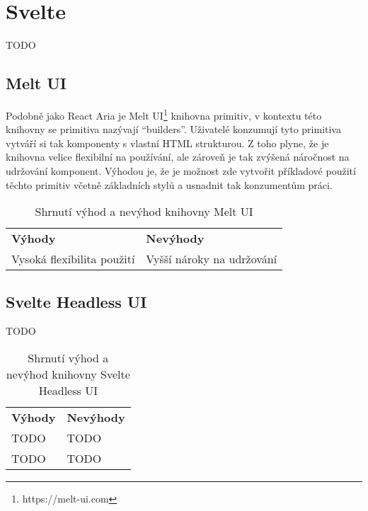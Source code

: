 \clearpage

\section{Svelte}

TODO

\subsection{Melt UI}

Podobně jako React Aria je Melt UI\footnote{https://melt-ui.com} knihovna primitiv, v kontextu této knihovny se primitiva nazývají ``builders''.
Uživatelé konzumují tyto primitiva vytváří si tak komponenty s vlastní HTML strukturou.
Z toho plyne, že je knihovna velice flexibilní na používání, ale zároveň je tak zvýšená náročnost na udržování komponent.
Výhodou je, že je možnost zde vytvořit příkladové použití těchto primitiv včetně základních stylů a usnadnit tak konzumentům práci.

\begin{table}[ht]
    \begin{ctucolortab}
        \begin{tabularx}{\textwidth}{Y Y}
            \bfseries \textcolor{OK}{Výhody} & \bfseries \textcolor{NOT_OK}{Nevýhody} \\\Midrule{}
            Vysoká flexibilita použití       & Vyšší nároky na udržování
        \end{tabularx}
    \end{ctucolortab}
    \caption{Shrnutí výhod a nevýhod knihovny Melt UI}
\end{table}

\subsection{Svelte Headless UI}

TODO

\begin{table}[ht]
    \begin{ctucolortab}
        \begin{tabularx}{\textwidth}{Y Y}
            \bfseries \textcolor{OK}{Výhody} & \bfseries \textcolor{NOT_OK}{Nevýhody} \\\Midrule{}
            TODO                             & TODO                                   \\
            TODO                             & TODO
        \end{tabularx}
    \end{ctucolortab}
    \caption{Shrnutí výhod a nevýhod knihovny Svelte Headless UI}
\end{table}

